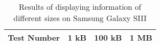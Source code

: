 	\begin{table}[ht!]
    		\caption{Results of displaying information of different sizes on Samsung Galaxy SIII} \label{tab:distamceGoogleGlassFull}
		\centering \begin{tabularx}{\textwidth}{l|X|X|X} \hline
		\textbf{Test Number} & \textbf{1 kB} & \textbf{100 kB} & \textbf{1 MB} \\ \hline \hline
%		
		

\end{tabularx}
\end{table}
